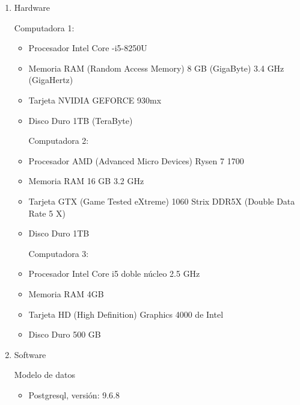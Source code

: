 \begin{enumerate}[1.]
    \item Hardware
    \\ \par
    Computadora 1:
		\begin{itemize}
		\item Procesador Intel Core -i5-8250U
		\item Memoria RAM (Random Access Memory) 8 GB (GigaByte) 3.4 GHz (GigaHertz)
		\item Tarjeta NVIDIA GEFORCE 930mx
		\item Disco Duro 1TB (TeraByte)
		\\ \par
    Computadora 2:
		\item Procesador AMD (Advanced Micro Devices) Rysen 7 1700
		\item Memoria RAM 16 GB 3.2 GHz
		\item Tarjeta GTX (Game Tested eXtreme) 1060 Strix DDR5X (Double Data Rate 5 X)
		\item Disco Duro 1TB
		\\ \par
    Computadora 3:
		\item Procesador Intel Core i5 doble núcleo 2.5 GHz
		\item Memoria RAM 4GB
		\item Tarjeta HD (High Definition) Graphics 4000 de Intel
		\item Disco Duro 500 GB
		\end{itemize}
    \item Software
	\\ \par
	Modelo de datos
	\begin{itemize}
	\item Postgresql, versión: 9.6.8
	\end{itemize}	    
    

\end{enumerate}
